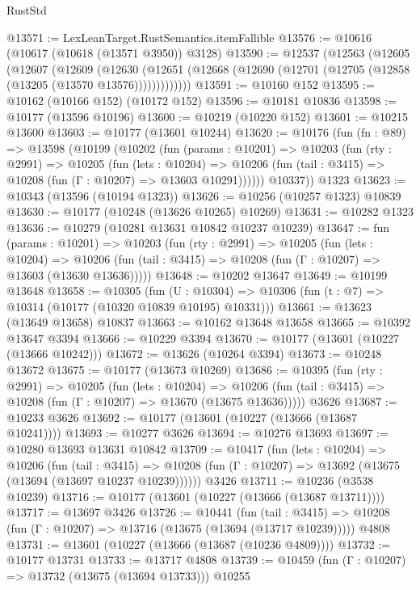 \begin{lexlean}{RustStd}
\begin{coremodule}
@13571 := LexLeanTarget.RustSemantics.itemFallible
@13576 := @10616 (@10617 (@10618 (@13571 @3950)) @3128)
@13590 := @12537
    (@12563
      (@12605
        (@12607
          (@12609
            (@12630
              (@12651 (@12668 (@12690 (@12701 (@12705 (@12858 (@13205 (@13570 @13576)))))))))))))
@13591 := @10160 @152
@13595 := @10162 (@10166 @152) (@10172 @152)
@13596 := @10181 @10836
@13598 := @10177 (@13596 @10196)
@13600 := @10219 (@10220 @152)
@13601 := @10215 @13600
@13603 := @10177 (@13601 @10244)
@13620 := @10176
    (fun (fn : @89) =>
    @13598
      (@10199
        (@10202
          (fun (params : @10201) =>
          @10203
            (fun (rty : @2991) =>
            @10205
              (fun (lets : @10204) =>
              @10206 (fun (tail : @3415) => @10208 (fun (Γ : @10207) => @13603 @10291))))))
        @10337))
    @1323
@13623 := @10343 (@13596 (@10194 @1323))
@13626 := @10256 (@10257 @1323) @10839
@13630 := @10177 (@10248 (@13626 @10265) @10269)
@13631 := @10282 @1323
@13636 := @10279 (@10281 @13631 @10842 @10237 @10239)
@13647 := fun (params : @10201) =>
  @10203
    (fun (rty : @2991) =>
    @10205
      (fun (lets : @10204) =>
      @10206 (fun (tail : @3415) => @10208 (fun (Γ : @10207) => @13603 (@13630 @13636)))))
@13648 := @10202 @13647
@13649 := @10199 @13648
@13658 := @10305
    (fun (U : @10304) => @10306 (fun (t : @7) => @10314 (@10177 (@10320 @10839 @10195) @10331)))
@13661 := @13623 (@13649 @13658) @10837
@13663 := @10162 @13648 @13658
@13665 := @10392 @13647 @3394
@13666 := @10229 @3394
@13670 := @10177 (@13601 (@10227 (@13666 @10242)))
@13672 := @13626 (@10264 @3394)
@13673 := @10248 @13672
@13675 := @10177 (@13673 @10269)
@13686 := @10395
    (fun (rty : @2991) =>
    @10205
      (fun (lets : @10204) =>
      @10206 (fun (tail : @3415) => @10208 (fun (Γ : @10207) => @13670 (@13675 @13636)))))
    @3626
@13687 := @10233 @3626
@13692 := @10177 (@13601 (@10227 (@13666 (@13687 @10241))))
@13693 := @10277 @3626
@13694 := @10276 @13693
@13697 := @10280 @13693 @13631 @10842
@13709 := @10417
    (fun (lets : @10204) =>
    @10206
      (fun (tail : @3415) =>
      @10208 (fun (Γ : @10207) => @13692 (@13675 (@13694 (@13697 @10237 @10239))))))
    @3426
@13711 := @10236 (@3538 @10239)
@13716 := @10177 (@13601 (@10227 (@13666 (@13687 @13711))))
@13717 := @13697 @3426
@13726 := @10441
    (fun (tail : @3415) => @10208 (fun (Γ : @10207) => @13716 (@13675 (@13694 (@13717 @10239)))))
    @4808
@13731 := @13601 (@10227 (@13666 (@13687 (@10236 @4809))))
@13732 := @10177 @13731
@13733 := @13717 @4808
@13739 := @10459 (fun (Γ : @10207) => @13732 (@13675 (@13694 @13733))) @10255

\end{coremodule}
\end{lexlean}
